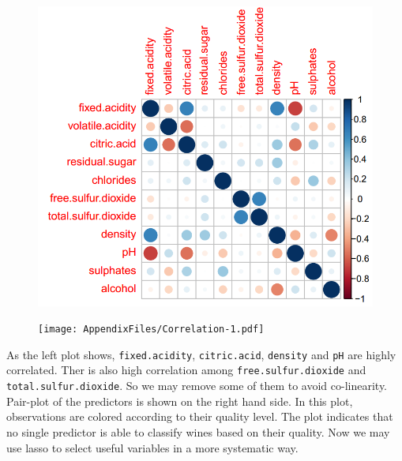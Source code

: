 \documentclass[../main.tex]{subfiles}
\begin{document}
\begin{figure}[H]
\begin{minipage}[]{.4\textwidth}
    \centering
    \includegraphics[scale=0.5]{Correlation.PNG}
    \label{fig:Cor1}
\end{minipage}
\hspace{0.5cm}
\begin{minipage}[]{.6\textwidth}
    \centering
    \texttt{[image: AppendixFiles/Correlation-1.pdf]}
    \label{fig:Cor2}
\end{minipage}
\end{figure}





\noindent As the left plot shows, \texttt{fixed.acidity}, \texttt{citric.acid}, \texttt{density} and \texttt{pH} are highly correlated. Ther is also high correlation among \texttt{free.sulfur.dioxide} and \texttt{total.sulfur.dioxide}. So we may remove some of them to avoid co-linearity. Pair-plot of the predictors is shown on the right hand side. In this plot, observations are colored according to their quality level. The plot indicates that no single predictor is able to classify wines based on their quality. Now we may use lasso to select useful variables in a more systematic way.

\vspace{0.5cm}
\begin{Shaded}
\begin{Highlighting}[]
\NormalTok{(}\OperatorTok{:}\NormalTok{(}\OperatorTok{*}\StringTok{ }\NormalTok{))}
\OperatorTok{:}\NormalTok{(Red_wine))[}\OperatorTok{-}\NormalTok{train]}
\StringTok{ }
\StringTok{ }
\end{Highlighting}
\end{Shaded}
\end{document}
